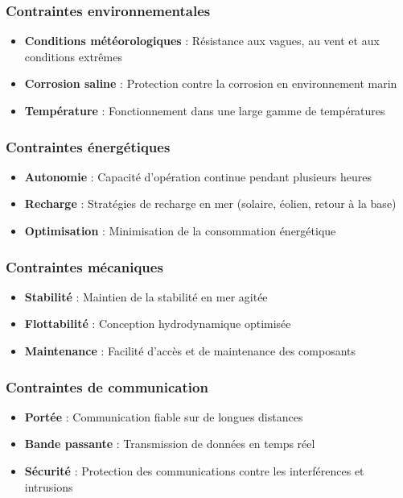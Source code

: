 {\subsubsection{Contraintes environnementales}
\begin{itemize}
    \item \textbf{Conditions météorologiques} : Résistance aux vagues, au vent et aux conditions extrêmes
    \item \textbf{Corrosion saline} : Protection contre la corrosion en environnement marin
    \item \textbf{Température} : Fonctionnement dans une large gamme de températures
\end{itemize}

\subsubsection{Contraintes énergétiques}
\begin{itemize}
    \item \textbf{Autonomie} : Capacité d'opération continue pendant plusieurs heures
    \item \textbf{Recharge} : Stratégies de recharge en mer (solaire, éolien, retour à la base)
    \item \textbf{Optimisation} : Minimisation de la consommation énergétique
\end{itemize}

\subsubsection{Contraintes mécaniques}
\begin{itemize}
    \item \textbf{Stabilité} : Maintien de la stabilité en mer agitée
    \item \textbf{Flottabilité} : Conception hydrodynamique optimisée
    \item \textbf{Maintenance} : Facilité d'accès et de maintenance des composants
\end{itemize}

\subsubsection{Contraintes de communication}
\begin{itemize}
    \item \textbf{Portée} : Communication fiable sur de longues distances
    \item \textbf{Bande passante} : Transmission de données en temps réel
    \item \textbf{Sécurité} : Protection des communications contre les interférences et intrusions
\end{itemize}

}
